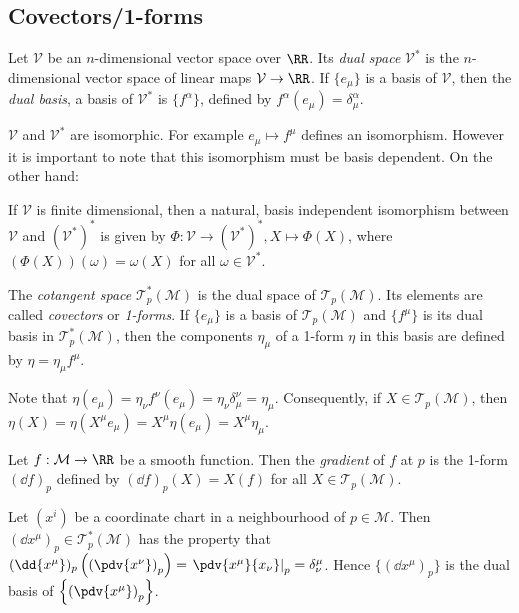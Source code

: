 \documentclass{jknotes}
\begin{document}
\subsection{Covectors/1-forms}
\begin{defn}
    Let \(\mathcal{V}\) be an \(n\)-dimensional vector space over \(\RR\). Its \emph{dual space} \(\mathcal{V}^*\) is the \(n\)-dimensional vector space of linear maps \(\mathcal{V}\to\RR\). If \(\{e_\mu\}\) is a basis of \(\mathcal{V}\), then the \emph{dual basis}, a basis of \(\mathcal{V}^*\) is \(\{f^\alpha\}\), defined by \(f^\alpha(e_\mu) = \delta^\alpha_\mu\).
\end{defn}

\(\mathcal{V}\) and \(\mathcal{V}^*\) are isomorphic. For example \(e_\mu \mapsto f^\mu\) defines an isomorphism. However it is important to note that this isomorphism must be basis dependent. On the other hand:
\begin{theorem}
    If \(\mathcal{V}\) is finite dimensional, then a natural, basis independent isomorphism between \(\mathcal{V}\) and \((\mathcal{V}^*)^*\) is given by \(\Phi:\mathcal{V}\to(\mathcal{V}^*)^*,X\mapsto\Phi(X)\), where \((\Phi(X))(\omega)=\omega(X)\) for all \(\omega \in \mathcal{V}^*\).
\end{theorem}

\begin{defn}
    The \emph{cotangent space} \(\mathcal{T}^*_p(\mathcal{M})\) is the dual space of \(\mathcal{T}_p(\mathcal{M})\). Its elements are called \emph{covectors} or \emph{1-forms}. If \(\{e_\mu\}\) is a basis of \(\mathcal{T}_p(\mathcal{M})\) and \(\{f^\mu\}\) is its dual basis in \(\mathcal{T}_p^*(\mathcal{M})\), then the components \(\eta_\mu\) of a 1-form \(\eta\) in this basis are defined by \(\eta = \eta_\mu f^\mu\).
\end{defn}

Note that \(\eta(e_\mu) = \eta_\nu f^\nu(e_\mu) = \eta_\nu\delta^\nu_\mu = \eta_\mu\). Consequently, if \(X \in \mathcal{T}_p(\mathcal{M})\), then \(\eta(X) = \eta(X^\mu e_\mu) = X^\mu\eta(e_\mu) = X^\mu\eta_\mu\).

\begin{defn}
    Let \(f:\mathcal{M}\to\RR\) be a smooth function. Then the \emph{gradient} of \(f\) at \(p\) is the 1-form \((\dd{f})_p\) defined by \((\dd{f})_p(X) = X(f)\) for all \(X \in \mathcal{T}_p(\mathcal{M})\).
\end{defn}
Let \((x^i)\) be a coordinate chart in a neighbourhood of \(p\in\mathcal{M}\). Then \((\dd{x^\mu})_p\in\mathcal{T}^*_p(\mathcal{M})\) has the property that \((\dd{x^\mu})_p\left(\left(\pdv{x^\nu}\right)_p\right) = \left.\pdv{x^\mu}{x_\nu}\right|_p = \delta^\mu_\nu\). Hence \(\{(\dd{x^\mu})_p\}\) is the dual basis of \(\left\{\left(\pdv{x^\mu}\right)_p\right\}\).
\end{document}
